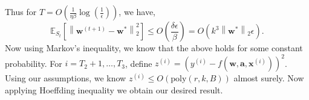 \documentclass[11pt]{article}
\newcommand{\poly}{\mathrm{poly}}
\newcommand{\E}{\mathbb{E}}
\newcommand{\vect}[1]{\mathbf{#1}}
\newcommand{\norm}[1]{\left\|#1\right\|}
\begin{document}
Thus for $T = O\left(\frac{1}{\eta\beta}\log\left(\frac{1}{\epsilon}\right)\right)$, we have,
\[
\E_{S_t}[\norm{\vect{w}^{\left(t+1\right)} - \vect{w}^*}_2^2] \leq O\left(\frac{\delta \epsilon}{\beta}\right) = O\left(k^3 \norm{\vect{w}^*}_2 \epsilon\right).
\]
Now using Markov's inequality, we know that the above holds for some constant probability.
For $i=T_2+1,\ldots,T_3$, define $z^{\left(i\right)} = \left(y^{\left(i\right)}-f\left(\vect{w},\vect{a},\vect{x}^{\left(i\right)}\right)\right)^2$.
Using our assumptions, we know $z^{\left(i\right)} \le O\left(
\poly\left(r,k,B\right)
\right)$ almost surely.
Now applying Hoeffding inequality we obtain our desired result.
\end{document}
